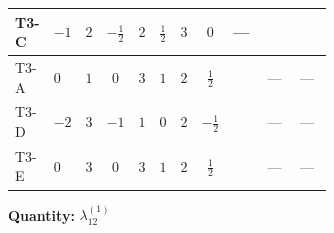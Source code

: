 \documentclass[8pt]{article}
\begin{document}
\begin{landscape}
\begin{longtable}{@{}llcccccc >{\raggedright\arraybackslash}p{0.21\linewidth} >{\raggedright\arraybackslash}p{0.21\linewidth} >{\raggedright\arraybackslash}p{0.21\linewidth}@{}}
\midrule
T3-C & $-1$ & $2$ & $-\frac{1}{2}$ & $2$ & $\frac{1}{2}$ & $3$ & $0$ & --- & \scriptsize\adjustbox{max width=\linewidth}{$\begin{gathered} -3 \operatorname{Tr}\!\left({y_1}\,\left({y_2}\right)^{\dagger}\,{y_2}\,\left({y_1}\right)^{\dagger}\right)\end{gathered}$} & \scriptsize\adjustbox{max width=\linewidth}{$\begin{gathered} +2 {\lambda_{H H^\dagger S_1^\dagger S_2^\dagger}^{\rm Cross}} \left({\lambda_{H H^\dagger S_1^\dagger S_2^\dagger}^{\rm Cross}}\right)^{*}\end{gathered}$} \\
\midrule
T3-A & $0$ & $1$ & $0$ & $3$ & $1$ & $2$ & $\frac{1}{2}$ & \scriptsize\adjustbox{max width=\linewidth}{$\begin{gathered} -4 \operatorname{Tr}\!\left({y_1}\,\left({y_1}\right)^{\dagger}\,{y_2}\,\left({y_2}\right)^{\dagger}\right)\end{gathered}$} & --- & --- \\
\midrule
T3-D & $-2$ & $3$ & $-1$ & $1$ & $0$ & $2$ & $-\frac{1}{2}$ & \scriptsize\adjustbox{max width=\linewidth}{$\begin{gathered} -4 \operatorname{Tr}\!\left({y_1}\,\left({y_1}\right)^{\dagger}\,{y_2}\,\left({y_2}\right)^{\dagger}\right)\end{gathered}$} & --- & --- \\
\midrule
T3-E & $0$ & $3$ & $0$ & $3$ & $1$ & $2$ & $\frac{1}{2}$ & \scriptsize\adjustbox{max width=\linewidth}{$\begin{gathered} -2 \operatorname{Tr}\!\left({y_1}\,\left({y_1}\right)^{\dagger}\,{y_2}\,\left({y_2}\right)^{\dagger}\right)\end{gathered}$} & --- & --- \\
\midrule
\bottomrule
\end{longtable}
\clearpage
\noindent\textbf{Quantity: }$\lambda_{12}^{(1)}$\par\smallskip

\end{landscape}
\end{document}
